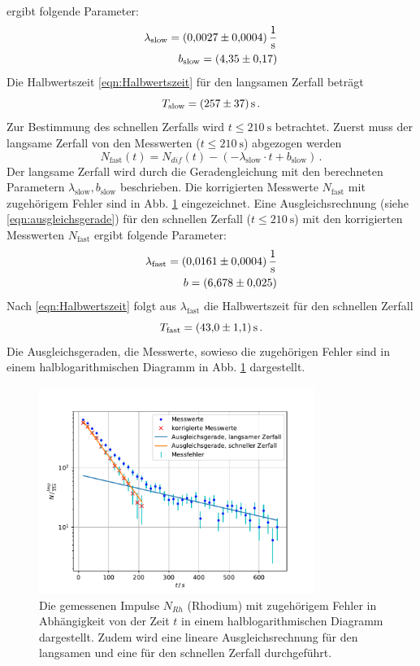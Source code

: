 ergibt folgende Parameter:
\begin{align*}
    \lambda_\text{slow} = \SI{0.0027+-0.0004}{\frac{1}{\second}} \\
    b_\text{slow} = \SI{4.35+-0.17}{}
\end{align*}
Die Halbwertszeit \eqref{eqn:Halbwertszeit} für den langsamen Zerfall beträgt
\begin{equation*}
    T_\text{slow} = \SI{257+-37}{\second} \, .
\end{equation*}
Zur Bestimmung des schnellen Zerfalls wird $t \leq \SI{210}{\second}$ betrachtet.
Zuerst muss der langsame Zerfall von den Messwerten ($t \leq \SI{210}{\second}$) abgezogen werden
\begin{equation}
    N_\text{fast}(t) = N_{dif}(t) - (-\lambda_\text{slow} \cdot t + b_\text{slow})  \, . 
\end{equation}
Der langsame Zerfall wird durch die Geradengleichung mit den berechneten Parametern $\lambda_\text{slow}, b_\text{slow}$ beschrieben.
Die korrigierten Messwerte $N_\text{fast}$ mit zugehörigem Fehler sind in Abb. \ref{fig:rhodium_plot} eingezeichnet.
Eine Ausgleichsrechnung (siehe \eqref{eqn:ausgleichsgerade}) für den schnellen Zerfall ($t \leq \SI{210}{\second}$) mit den korrigierten Messwerten $N_\text{fast}$ ergibt folgende Parameter:
\begin{align*}
    \lambda_\text{fast} = \SI{0.0161+-0.0004}{\frac{1}{\second}} \\
    b = \SI{6.678+-0.025}{}
\end{align*}
Nach \eqref{eqn:Halbwertszeit} folgt aus $\lambda_\text{fast}$ die Halbwertszeit für den schnellen Zerfall
\begin{equation*}
    T_\text{fast} = \SI{43.0+-1.1}{\second} \, .
\end{equation*}
Die Ausgleichsgeraden, die Messwerte, sowieso die zugehörigen Fehler sind in einem halblogarithmischen Diagramm in Abb. \ref{fig:rhodium_plot} dargestellt.
\begin{figure}
    \centering
    \includegraphics[width=0.8\textwidth]{content/data/rhodium.pdf}
    \caption{Die gemessenen Impulse $N_{Rh}$ (Rhodium) mit zugehörigem Fehler in Abhängigkeit von der Zeit $t$ in einem halblogarithmischen Diagramm dargestellt. Zudem wird eine lineare Ausgleichsrechnung für den langsamen und eine für den schnellen Zerfall durchgeführt. \cite{matplotlib} \cite{numpy} \cite{scipy} \cite{uncertainties}}
    \label{fig:rhodium_plot}
\end{figure}